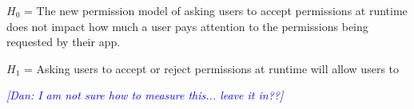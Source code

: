 \documentclass{sig-alternate-05-2015}
\newcommand{\dan}[1]{\textcolor{blue}{{\it [Dan: #1]}}}
\begin{document}
\begin{enumerate}
$H_0$ = The new permission model of asking users to accept permissions at runtime does not impact how much a user pays attention to the permissions being requested by their app.

$H_1$ = Asking users to accept or reject permissions at runtime will allow users to


\dan{I am not sure how to measure this... leave it in??}



%
%



\end{enumerate}













\end{document}
